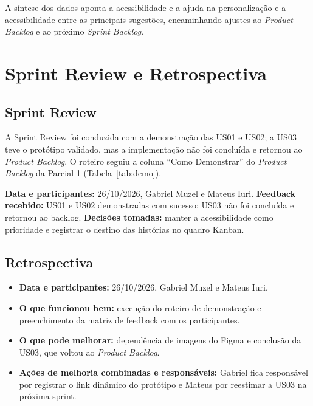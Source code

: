 \documentclass[12pt, oneside, a4paper, chapter=TITLE,section=TITLE]{abntex2}
\begin{document}
A síntese dos dados aponta a acessibilidade e a ajuda na personalização e a acessibilidade entre as principais sugestões, encaminhando ajustes ao \textit{Product Backlog} e ao próximo \textit{Sprint Backlog}.

\chapter{Sprint Review e Retrospectiva}

\section{Sprint Review}

A Sprint Review foi conduzida com a demonstração das US01 e US02; a US03 teve o protótipo validado, mas a implementação não foi concluída e retornou ao \textit{Product Backlog}. O roteiro seguiu a coluna ``Como Demonstrar'' do \textit{Product Backlog} da Parcial 1 (Tabela~\ref{tab:demo}).

\begin{table}[ht]
\centering
\caption{Roteiro de demonstração usado na Sprint Review.}
\label{tab:demo}
\end{table}

\textbf{Data e participantes:} 26/10/2026, Gabriel Muzel e Mateus Iuri. \textbf{Feedback recebido:} US01 e US02 demonstradas com sucesso; US03 não foi concluída e retornou ao backlog. \textbf{Decisões tomadas:} manter a acessibilidade como prioridade e registrar o destino das histórias no quadro Kanban.

\section{Retrospectiva}

\begin{itemize}
  \item \textbf{Data e participantes:} 26/10/2026, Gabriel Muzel e Mateus Iuri.
  \item \textbf{O que funcionou bem:} execução do roteiro de demonstração e preenchimento da matriz de feedback com os participantes.
  \item \textbf{O que pode melhorar:} dependência de imagens do Figma e conclusão da US03, que voltou ao \textit{Product Backlog}.
  \item \textbf{Ações de melhoria combinadas e responsáveis:} Gabriel fica responsável por registrar o link dinâmico do protótipo e Mateus por reestimar a US03 na próxima sprint.
\end{itemize}
\end{document}
